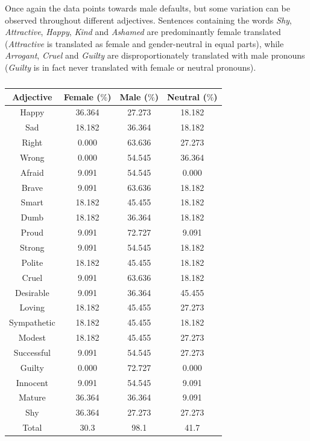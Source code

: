 \documentclass[fleqn,10pt]{article}
\begin{document}
Once again the data points towards male defaults, but some variation can be observed throughout different adjectives. Sentences containing the words \emph{Shy}, \emph{Attractive}, \emph{Happy}, \emph{Kind} and \emph{Ashamed} are predominantly female translated (\emph{Attractive} is translated as female and gender-neutral in equal parts), while \emph{Arrogant}, \emph{Cruel} and \emph{Guilty} are disproportionately translated with male pronouns (\emph{Guilty} is in fact never translated with female or neutral pronouns).



\begin{table}[H]
\small{
	\centering
	\begin{tabular}{|c|c|c|c|}
	\hline
	Adjective & Female ($\%$) & Male ($\%$) & Neutral ($\%$) \\ \hline \hline
	Happy & 36.364 & 27.273 & 18.182 \\ \hline
	Sad & 18.182 & 36.364 & 18.182 \\ \hline
	Right & 0.000 & 63.636 & 27.273 \\ \hline
	Wrong & 0.000 & 54.545 & 36.364 \\ \hline
	Afraid & 9.091 & 54.545 & 0.000 \\ \hline
	Brave & 9.091 & 63.636 & 18.182 \\ \hline
	Smart & 18.182 & 45.455 & 18.182 \\ \hline
	Dumb & 18.182 & 36.364 & 18.182 \\ \hline
	Proud & 9.091 & 72.727 & 9.091 \\ \hline
	Strong & 9.091 & 54.545 & 18.182 \\ \hline
	Polite & 18.182 & 45.455 & 18.182 \\ \hline
	Cruel & 9.091 & 63.636 & 18.182 \\ \hline
	Desirable & 9.091 & 36.364 & 45.455 \\ \hline
	Loving & 18.182 & 45.455 & 27.273 \\ \hline
	Sympathetic & 18.182 & 45.455 & 18.182 \\ \hline
	Modest & 18.182 & 45.455 & 27.273 \\ \hline
	Successful & 9.091 & 54.545 & 27.273 \\ \hline
	Guilty & 0.000 & 72.727 & 0.000 \\ \hline
	Innocent & 9.091 & 54.545 & 9.091 \\ \hline
	Mature & 36.364 & 36.364 & 9.091 \\ \hline
	Shy & 36.364 & 27.273 & 27.273 \\ \hline \hline
	Total & 30.3 & 98.1 & 41.7 \\ \hline

	\end{tabular}
	\caption{}
	\label{tab:gender-by-adjective}
	}
\end{table}
\end{document}
